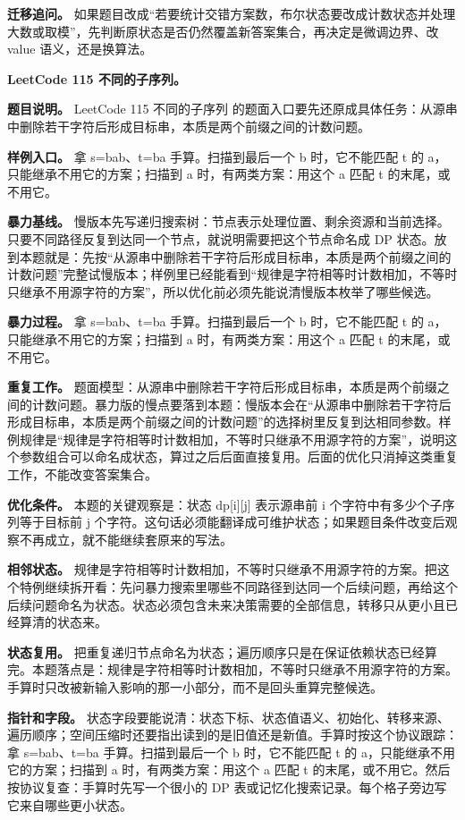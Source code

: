 \textbf{迁移追问。} 如果题目改成“若要统计交错方案数，布尔状态要改成计数状态并处理大数或取模”，先判断原状态是否仍然覆盖新答案集合，再决定是微调边界、改 value 语义，还是换算法。

\noindent\textbf{LeetCode 115 不同的子序列。}

\textbf{题目说明。} LeetCode 115 不同的子序列 的题面入口要先还原成具体任务：从源串中删除若干字符后形成目标串，本质是两个前缀之间的计数问题。

\textbf{样例入口。} 拿 s=bab、t=ba 手算。扫描到最后一个 b 时，它不能匹配 t 的 a，只能继承不用它的方案；扫描到 a 时，有两类方案：用这个 a 匹配 t 的末尾，或不用它。

\textbf{暴力基线。} 慢版本先写递归搜索树：节点表示处理位置、剩余资源和当前选择。只要不同路径反复到达同一个节点，就说明需要把这个节点命名成 DP 状态。放到本题就是：先按“从源串中删除若干字符后形成目标串，本质是两个前缀之间的计数问题”完整试慢版本；样例里已经能看到“规律是字符相等时计数相加，不等时只继承不用源字符的方案”，所以优化前必须先能说清慢版本枚举了哪些候选。

\textbf{暴力过程。} 拿 s=bab、t=ba 手算。扫描到最后一个 b 时，它不能匹配 t 的 a，只能继承不用它的方案；扫描到 a 时，有两类方案：用这个 a 匹配 t 的末尾，或不用它。

\textbf{重复工作。} 题面模型：从源串中删除若干字符后形成目标串，本质是两个前缀之间的计数问题。暴力版的慢点要落到本题：慢版本会在“从源串中删除若干字符后形成目标串，本质是两个前缀之间的计数问题”的选择树里反复到达相同参数。样例规律是“规律是字符相等时计数相加，不等时只继承不用源字符的方案”，说明这个参数组合可以命名成状态，算过之后后面直接复用。后面的优化只消掉这类重复工作，不能改变答案集合。

\textbf{优化条件。} 本题的关键观察是：状态 dp[i][j] 表示源串前 i 个字符中有多少个子序列等于目标前 j 个字符。这句话必须能翻译成可维护状态；如果题目条件改变后观察不再成立，就不能继续套原来的写法。

\textbf{相邻状态。} 规律是字符相等时计数相加，不等时只继承不用源字符的方案。把这个特例继续拆开看：先问暴力搜索里哪些不同路径到达同一个后续问题，再给这个后续问题命名为状态。状态必须包含未来决策需要的全部信息，转移只从更小且已经算清的状态来。

\textbf{状态复用。} 把重复递归节点命名为状态；遍历顺序只是在保证依赖状态已经算完。本题落点是：规律是字符相等时计数相加，不等时只继承不用源字符的方案。手算时只改被新输入影响的那一小部分，而不是回头重算完整候选。

\textbf{指针和字段。} 状态字段要能说清：状态下标、状态值语义、初始化、转移来源、遍历顺序；空间压缩时还要指出读到的是旧值还是新值。手算时按这个协议跟踪：拿 s=bab、t=ba 手算。扫描到最后一个 b 时，它不能匹配 t 的 a，只能继承不用它的方案；扫描到 a 时，有两类方案：用这个 a 匹配 t 的末尾，或不用它。然后按协议复查：手算时先写一个很小的 DP 表或记忆化搜索记录。每个格子旁边写它来自哪些更小状态。

